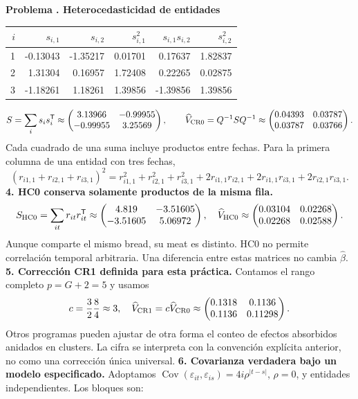 \documentclass[11pt,a4paper]{article}
\newcommand{\T}{^{\mathsf T}}
\DeclareMathOperator{\Cov}{Cov}
\theoremstyle{definition}
\newcounter{problema}
\newenvironment{resuelto}[1]{\refstepcounter{problema}\par\medskip\Needspace{6\baselineskip}\textbf{Problema \theproblema. #1}\par}{\par\medskip}
\newcommand{\eps}{\varepsilon}
\begin{document}
\begin{resuelto}{Heterocedasticidad de entidades}
\begin{center}\small
\begin{tabular}{rrrrrr}
\toprule
$i$&$s_{i,1}$&$s_{i,2}$&$s_{i,1}^2$&$s_{i,1}s_{i,2}$&$s_{i,2}^2$\\
\midrule
1&-0.13043&-1.35217&0.01701&0.17637&1.82837\\
2&1.31304&0.16957&1.72408&0.22265&0.02875\\
3&-1.18261&1.18261&1.39856&-1.39856&1.39856\\
\bottomrule
\end{tabular}
\end{center}
\[
S=\sum_i s_is_i\T\approx\begin{pmatrix}
3.13966&-0.99955\\-0.99955&3.25569
\end{pmatrix},\qquad \widehat V_{\rm CR0}=Q^{-1}SQ^{-1}\approx\begin{pmatrix}
0.04393&0.03787\\0.03787&0.03766
\end{pmatrix}.
\]
Cada cuadrado de una suma incluye productos entre fechas. Para la primera columna de una entidad con tres fechas,
\[
(r_{i1,1}+r_{i2,1}+r_{i3,1})^2
=r_{i1,1}^2+r_{i2,1}^2+r_{i3,1}^2
+2r_{i1,1}r_{i2,1}+2r_{i1,1}r_{i3,1}+2r_{i2,1}r_{i3,1}.
\]
\textbf{4. HC0 conserva solamente productos de la misma fila.}
\[
S_{\rm HC0}=\sum_{it}r_{it}r_{it}\T\approx\begin{pmatrix}
4.819&-3.51605\\-3.51605&5.06972
\end{pmatrix},\quad
\widehat V_{\rm HC0}\approx\begin{pmatrix}
0.03104&0.02268\\0.02268&0.02588
\end{pmatrix}.
\]
Aunque comparte el mismo bread, su meat es distinto. HC0 no permite correlación temporal arbitraria. Una diferencia entre estas matrices no cambia $\widehat\beta$.
\textbf{5. Corrección CR1 definida para esta práctica.} Contamos el rango completo $p=G+2=5$ y usamos
\[
c=\frac{3}{2}\frac{8}{4}\approx3,\quad \widehat V_{\rm CR1}=c\widehat V_{\rm CR0}\approx\begin{pmatrix}
0.1318&0.1136\\0.1136&0.11298
\end{pmatrix}.
\]
Otros programas pueden ajustar de otra forma el conteo de efectos absorbidos anidados en clusters. La cifra se interpreta con la convención explícita anterior, no como una corrección única universal.
\textbf{6. Covarianza verdadera bajo un modelo especificado.} Adoptamos $\Cov(\eps_{it},\eps_{is})=4i\rho^{|t-s|}$, $\rho=0$, y entidades independientes. Los bloques son:

\end{resuelto}
\end{document}
